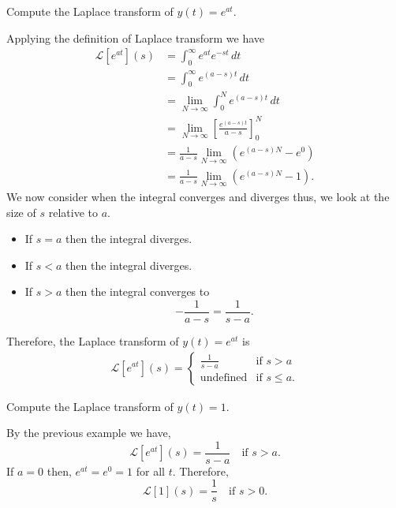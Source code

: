 \documentclass[12pt, a4paper]{article}
\newcommand{\CL}{\mathcal{L}}
\begin{document}
\begin{mdexample}
    Compute the Laplace transform of \(y(t) = e^{at}\).
    \begin{solution}
        Applying the definition of Laplace transform we have 
        \[\begin{aligned}
            \CL[e^{at}](s) &= \int_{0}^{\infty} e^{at} e^{-st} \, dt \\
            &= \int_{0}^{\infty} e^{(a-s)t} \, dt \\
            &= \lim_{N \to \infty} \int_{0}^{N} e^{(a-s)t} \, dt \\
            &= \lim_{N \to \infty} \left[ \frac{e^{(a-s)t}}{a-s}\right]_0^N \\
            &= \frac{1}{a-s} \lim_{N \to \infty} \left( e^{(a-s) N} - e^0 \right) \\
            &= \frac{1}{a-s} \lim_{N \to \infty} \left( e^{(a-s) N} - 1 \right).
        \end{aligned}\]
        We now consider when the integral converges and diverges thus, we look at the size of \(s\) relative to \(a\).
        \begin{itemize}
            \item If \(s = a\) then the integral diverges.
            \item If \(s <a\) then the integral diverges.
            \item If \(s>a\) then the integral converges to
            \[- \frac{1}{a-s} = \frac{1}{s-a}.\]
        \end{itemize}
        Therefore, the Laplace transform of \(y(t) = e^{at}\) is 
        \[\begin{aligned}
            \CL[e^{at}](s) = \begin{cases}
            \frac{1}{s-a} &\text{if } s>a \\
            \text{undefined} &\text{if } s\leq a.
            \end{cases}
        \end{aligned}\]
    \end{solution}
\end{mdexample}

\begin{example}
    Compute the Laplace transform of \(y(t)=1\).
    \begin{solution}
        By the previous example we have,
        \[\CL[e^{at}](s) = \frac{1}{s-a} \quad \text{if } s>a.\]
        If \(a=0\) then, \(e^{at} = e^0 =1\) for all \(t\). Therefore,
        \[\CL[1](s) = \frac{1}{s} \quad  \text{if } s>0. \]
    \end{solution}
\end{example}
\end{document}

